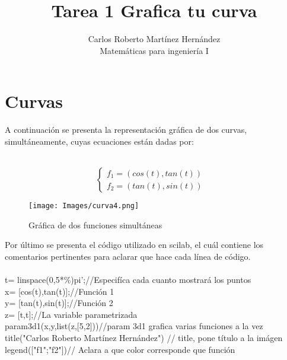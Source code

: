 \documentclass[12pt]{article}
\begin{document}
 
 
\title{Tarea 1 Grafica tu curva}
\author{Carlos Roberto Martínez Hernández\\ %
Matemáticas para ingeniería I}

\maketitle
\section{Curvas}
A continuación se presenta la representación gráfica de dos curvas, simultáneamente, cuyas ecuaciones están dadas por:


\
\[\left\{ \begin{array}{rcl}
f_{1}=(cos(t),tan(t))
\\
f_{2}=(tan(t),sin(t)) 
& 
\end{array}
\right. \]


\begin{figure}[h]
\centering
\texttt{[image: Images/curva4.png]} 
\caption{Gráfica de dos funciones simultáneas}
\label{etiqueta}
\end{figure}

Por último se presenta el código utilizado en scilab, el cuál contiene los comentarios pertinentes para aclarar que hace cada línea de código. \\\\
t= linspace(0,5*\%)pi';\hfill//Especifíca cada cuanto mostrará los puntos\\
x= [cos(t),tan(t)];\hfill//Función 1\\
y= [tan(t),sin(t)];\hfill         //Función 2\\
z= [t,t];\hfill//La variable parametrizada\\
param3d1(x,y,list(z,[5,2]))\hfill//param 3d1 grafica varias funciones a la vez
title("Carlos Roberto Martínez Hernández") \hfill// title, pone título a la imágen\\
legend(["f1";"f2"])\hfill// Aclara a que color corresponde que función

 
\end{document}
